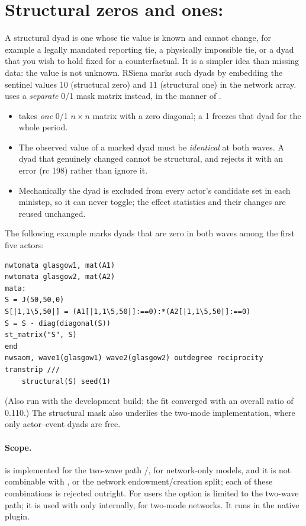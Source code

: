 \section{Structural zeros and ones: }\label{sec:structural}
A structural dyad is one whose tie value is known and cannot change, for example a legally mandated reporting tie, a physically impossible tie, or a dyad that you wish to hold fixed for a counterfactual. It is a simpler idea than missing data: the value is not unknown. RSiena marks such dyads by embedding the sentinel values 10 (structural zero) and 11 (structural one) in the network array. \nwsaom{} uses a \emph{separate} 0/1 mask matrix instead, in the manner of .
\begin{itemize}
\item {} takes \emph{one} 0/1 $n\times n$ matrix with a zero diagonal; a 1 freezes that dyad for the whole period.
\item The observed value of a marked dyad must be \emph{identical} at both waves. A dyad that genuinely changed cannot be structural, and \nwsaom{} rejects it with an error (rc 198) rather than ignore it.
\item Mechanically the dyad is excluded from every actor's candidate set in each ministep, so it can never toggle; the effect statistics and their changes are reused unchanged.
\end{itemize}
The following example marks dyads that are zero in both waves among the first five actors:
\begin{lstlisting}
nwtomata glasgow1, mat(A1)
nwtomata glasgow2, mat(A2)
mata:
S = J(50,50,0)
S[|1,1\5,50|] = (A1[|1,1\5,50|]:==0):*(A2[|1,1\5,50|]:==0)
S = S - diag(diagonal(S))
st_matrix("S", S)
end
nwsaom, wave1(glasgow1) wave2(glasgow2) outdegree reciprocity transtrip ///
    structural(S) seed(1)
\end{lstlisting}
(Also run with the development build; the fit converged with an overall ratio of 0.110.) The structural mask also underlies the two-mode implementation, where only actor--event dyads are free.

\paragraph{Scope.}  is implemented for the two-wave path /, for network-only models, and it is not combinable with ,  or the network endowment/creation split; each of these combinations is rejected outright. For users the option is limited to the two-wave path; it is used with  only internally, for two-mode networks. It runs in the native plugin.

